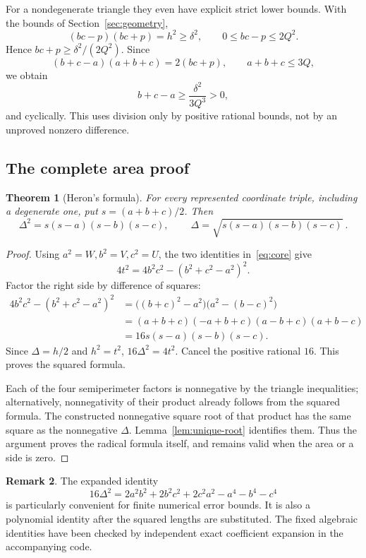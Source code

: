 \documentclass[11pt,a4paper]{article}
\newtheorem{theorem}{Theorem}[section]
\theoremstyle{definition}
\newtheorem{remark}[theorem]{Remark}
\numberwithin{equation}{section}
\begin{document}
For a nondegenerate triangle they even have explicit strict
lower bounds. With the bounds of Section~\ref{sec:geometry},
\[
 (bc-p)(bc+p)=h^2\ge\delta^2,\qquad
 0\le bc-p\le2Q^2.
\]
Hence \(bc+p\ge\delta^2/(2Q^2)\). Since
\[
 (b+c-a)(a+b+c)=2(bc+p),\qquad a+b+c\le3Q,
\]
we obtain
\[
 b+c-a\ge\frac{\delta^2}{3Q^3}>0,
 \tag{7.1}\label{eq:strict-gap}
\]
and cyclically. This uses division only by positive rational
bounds, not by an unproved nonzero difference.

\subsection{The complete area proof}

\begin{theorem}[Heron's formula]\label{thm:heron}
For every represented coordinate triple, including a degenerate one,
put \(s=(a+b+c)/2\). Then
\[
 \Delta^2=s(s-a)(s-b)(s-c),\qquad
 \boxed{\ \Delta=\sqrt{s(s-a)(s-b)(s-c)}\ }.
\]
\end{theorem}

\begin{proof}
Using \(a^2=W,b^2=V,c^2=U\), the two identities
in~\eqref{eq:core} give
\[
 4t^2=4b^2c^2-(b^2+c^2-a^2)^2.
 \tag{7.2}
\]
Factor the right side by difference of squares:
\begin{align*}
 4b^2c^2-(b^2+c^2-a^2)^2
 &=\bigl((b+c)^2-a^2\bigr)
      \bigl(a^2-(b-c)^2\bigr)\\
 &=(a+b+c)(-a+b+c)(a-b+c)(a+b-c)\\
 &=16s(s-a)(s-b)(s-c).
\end{align*}
Since \(\Delta=h/2\) and \(h^2=t^2\),
\(16\Delta^2=4t^2\). Cancel the positive rational \(16\).
This proves the squared formula.

Each of the four semiperimeter factors is nonnegative by the
triangle inequalities; alternatively, nonnegativity of their product
already follows from the squared formula. The constructed
nonnegative square root of that product has the same square as the
nonnegative \(\Delta\). Lemma~\ref{lem:unique-root} identifies them.
Thus the argument proves the radical formula itself, and remains
valid when the area or a side is zero.
\end{proof}

\begin{remark}
The expanded identity
\[
 16\Delta^2=
 2a^2b^2+2b^2c^2+2c^2a^2-a^4-b^4-c^4
 \tag{7.3}\label{eq:heron-symmetric}
\]
is particularly convenient for finite numerical error bounds.
It is also a polynomial identity after the squared lengths are
substituted. The fixed algebraic identities have been checked by
independent exact coefficient expansion in the accompanying code.
\end{remark}
\end{document}
